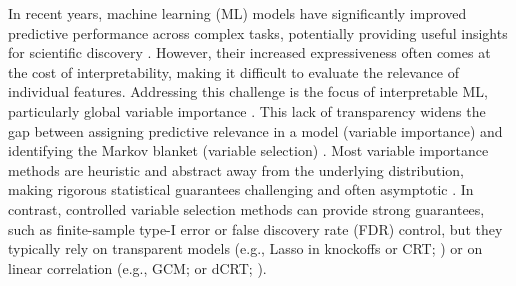 \documentclass{article}
\theoremstyle{plain}
\theoremstyle{definition}
\theoremstyle{remark}
\begin{document}
In recent years, machine learning (ML) models have significantly improved predictive performance across complex tasks, potentially providing useful insights for scientific discovery \cite{Ewald_2024}. However, their increased expressiveness often comes at the cost of interpretability, making it difficult to evaluate the relevance of individual features. Addressing this challenge is the focus of interpretable ML, particularly global variable importance \cite{covert2020understanding, williamson2023general, molnar2025}. This lack of transparency widens the gap between assigning predictive relevance in a model (variable importance) and identifying the Markov blanket (variable selection) \cite{reyerolobo2025principledapproachcomparingvariable}. Most variable importance methods are heuristic and abstract away from the underlying distribution, making rigorous statistical guarantees challenging and often asymptotic \cite{williamson2023general, LocoVSShapley}. In contrast, controlled variable selection methods can provide strong guarantees, such as finite-sample type-I error or false discovery rate (FDR) control, but they typically rely on transparent models (e.g., Lasso in knockoffs or CRT; \citet{candes2018panning}) or on linear correlation (e.g., GCM; \citet{shah_peters_CIT} or dCRT; \citet{liu2022fast}).


\end{document}
